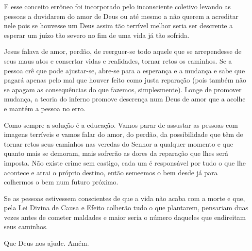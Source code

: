 \emdash{}E esse conceito errôneo foi incorporado pelo inconsciente coletivo levando as pessoas a duvidarem do amor de Deus ou até mesmo a não querem a acreditar nele pois se houvesse um Deus assim tão terrível melhor seria ser descrente a esperar um juízo tão severo no fim de uma vida já tão sofrida.

\emdash{}Jesus falava de amor, perdão, de reerguer-se todo aquele que se arrependesse de seus maus atos e consertar vidas e realidades, tornar retos os caminhos. Se a pessoa crê que pode ajustar-se, abre-se para a esperança e a mudança e sabe que pagará apenas pelo mal que houver feito como justa reparação (pois também não se apagam as consequências do que fazemos, simplesmente). Longe de promover mudança, a teoria do inferno promove descrença num Deus de amor que a acolhe e mantém a pessoa no erro.

\emdash{}Como sempre a solução é a educação. Vamos parar de assustar as pessoas com imagens terríveis e vamos falar do amor, do perdão, da possibilidade que têm de tornar retos seus caminhos nas veredas do Senhor a qualquer momento e que quanto mais se demoram, mais sofrerão as dores da reparação que lhes será imposta. Não existe crime sem castigo, cada um é responsável por tudo o que lhe acontece e atrai o próprio destino, então semeemos o bem desde já para colhermos o bem num futuro próximo.

\emdash{}Se as pessoas estivessem conscientes de que a vida não acaba com a morte e que, pela Lei Divina de Causa e Efeito colherão tudo o que plantarem, pensariam duas vezes antes de cometer maldades e maior seria o número daqueles que endireitam seus caminhos.


\emdash{}Que Deus nos ajude. Amém.